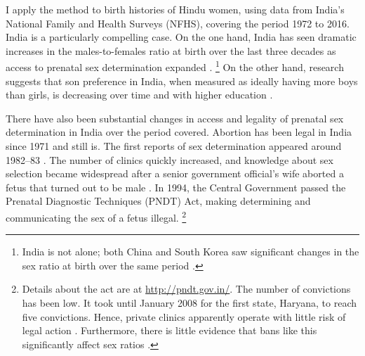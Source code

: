 \documentclass[12pt,letterpaper]{article}
\begin{document}
I apply the method to birth histories of Hindu women, using data from 
India's National Family and Health Surveys (NFHS), covering the period 
1972 to 2016. 
India is a particularly compelling case.
On the one hand, India has seen dramatic increases in the males-to-females ratio 
at birth over the last three decades as access to prenatal sex determination 
expanded 
\citep{das_gupta97,Sudha1999,Arnold2002,retherford03b,jha06}.%
\footnote{
India is not alone; both China and South Korea saw
significant changes in the sex ratio at birth over the same period 
\citep{Yi1993,park95}.
}
On the other hand, research suggests that son preference in 
India, when measured as ideally having more boys than girls, is decreasing 
over time and with higher education \citep{bhat03,pande07}.

There have also been substantial changes in access and legality of
prenatal sex determination in India over the period covered.
Abortion has been legal in India since 1971 and still is.
The first reports of sex determination appeared around 
1982--83 \citep{Sudha1999,bhat06,Grover2006}.
The number of clinics quickly increased, and knowledge about sex selection 
became widespread after a senior government official's wife aborted a 
fetus that turned out to be male \citep[p.\ 598]{Sudha1999}.
In 1994, the Central Government passed the Prenatal Diagnostic Techniques 
(PNDT) Act, making determining and communicating the sex of a fetus illegal.%
\footnote{
Details about the act are at \href{http://pndt.gov.in/}{http://pndt.gov.in/}.
The number of convictions has been low.
It took until January 2008 for the first state, Haryana, to reach five convictions.
Hence, private clinics apparently operate with little risk of legal action 
\citep{Sudha1999}.
Furthermore, there is little evidence that bans like this significantly
affect sex ratios \citep{Das-Gupta2016}.
}
\end{document}
